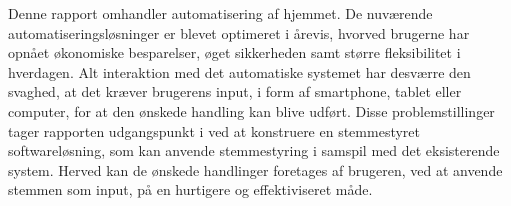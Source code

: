 Denne rapport omhandler automatisering af hjemmet. De nuværende automatiseringsløsninger er blevet optimeret i årevis, hvorved brugerne har opnået økonomiske besparelser, øget sikkerheden samt større fleksibilitet i hverdagen. Alt interaktion med det automatiske systemet har desværre den svaghed, at det kræver brugerens input, i form af smartphone, tablet eller computer, for at den ønskede handling kan blive udført. Disse problemstillinger tager rapporten udgangspunkt i ved at konstruere en stemmestyret softwareløsning, som kan anvende stemmestyring i samspil med det eksisterende system. Herved kan de ønskede handlinger foretages af brugeren, ved at anvende stemmen som input, på en hurtigere og effektiviseret måde.